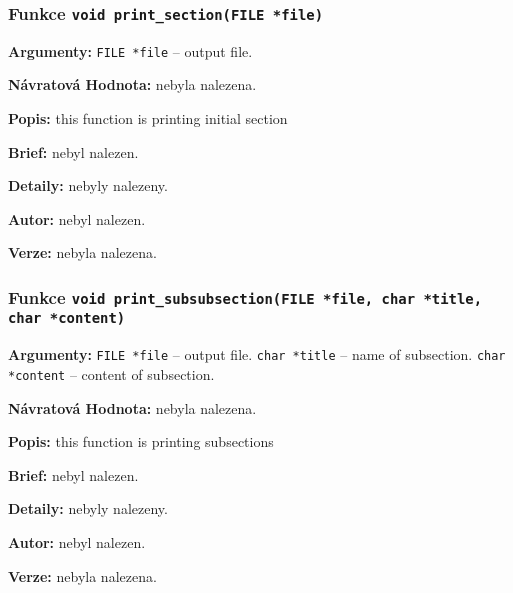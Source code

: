 \documentclass[12pt, a4paper]{article}
\begin{document}
\subsubsection{Funkce \texttt{void print\_section(FILE *file)}}
\textbf{Argumenty: }\verb"FILE *file" -- output file. \\
\par\noindent
\textbf{Návratová Hodnota: }nebyla nalezena.\\
\par\noindent
\textbf{Popis: }this function is printing initial section\\
\par\noindent
\textbf{Brief: }nebyl nalezen.\\
\par\noindent
\textbf{Detaily: }nebyly nalezeny.\\
\par\noindent
\textbf{Autor: }nebyl nalezen.\\
\par\noindent
\textbf{Verze: }nebyla nalezena.\\
\par\noindent
\subsubsection{Funkce \texttt{void print\_subsubsection(FILE *file, char *title, char *content)}}
\textbf{Argumenty: }\verb"FILE *file" -- output file. \verb"char *title" -- name of subsection. \verb"char *content" -- content of subsection. \\
\par\noindent
\textbf{Návratová Hodnota: }nebyla nalezena.\\
\par\noindent
\textbf{Popis: }this function is printing subsections\\
\par\noindent
\textbf{Brief: }nebyl nalezen.\\
\par\noindent
\textbf{Detaily: }nebyly nalezeny.\\
\par\noindent
\textbf{Autor: }nebyl nalezen.\\
\par\noindent
\textbf{Verze: }nebyla nalezena.\\
\par\noindent
\end{document}
